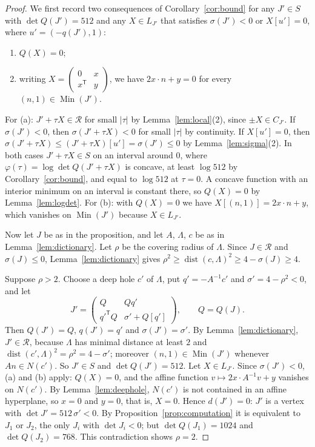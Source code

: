 \documentclass[11pt]{amsart}
\theoremstyle{definition}
\theoremstyle{remark}
\numberwithin{equation}{section}
\numberwithin{table}{section}
\numberwithin{figure}{section}
\newcommand{\Rk}{\mathcal{R}}
\newcommand{\Min}{\operatorname{Min}}
\newcommand{\dist}{\operatorname{dist}}
\newcommand{\T}{\mathsf{T}}
\begin{document}
\begin{proof}
We first record two consequences of Corollary~\ref{cor:bound} for any $J'\in S$ with $\det Q(J')=512$ and any $X\in L_{J'}$ that satisfies $\sigma(J')<0$ or $X[u']=0$, where $u'=(-q(J'),1)$:
\begin{enumerate}
\item[(a)] $Q(X)=0$;
\item[(b)] writing $X=\left(\begin{smallmatrix}0&x\\x^\T&y\end{smallmatrix}\right)$, we have $2x\cdot n+y=0$ for every $(n,1)\in\Min(J')$.
\end{enumerate}
For (a): $J'+\tau X\in\Rk$ for small $|\tau|$ by Lemma~\ref{lem:local}(2), since $\pm X\in C_{J'}$. If $\sigma(J')<0$, then $\sigma(J'+\tau X)<0$ for small $|\tau|$ by continuity. If $X[u']=0$, then $\sigma(J'+\tau X)\le(J'+\tau X)[u']=\sigma(J')\le0$ by Lemma~\ref{lem:sigma}(2). In both cases $J'+\tau X\in S$ on an interval around $0$, where $\varphi(\tau)=\log\det Q(J'+\tau X)$ is concave, at least $\log512$ by Corollary~\ref{cor:bound}, and equal to $\log512$ at $\tau=0$. A concave function with an interior minimum on an interval is constant there, so $Q(X)=0$ by Lemma~\ref{lem:logdet}. For (b): with $Q(X)=0$ we have $X[(n,1)]=2x\cdot n+y$, which vanishes on $\Min(J')$ because $X\in L_{J'}$.

Now let $J$ be as in the proposition, and let $A$, $\Lambda$, $c$ be as in Lemma~\ref{lem:dictionary}. Let $\rho$ be the covering radius of $\Lambda$. Since $J\in\Rk$ and $\sigma(J)\le0$, Lemma~\ref{lem:dictionary} gives $\rho^2\ge\dist(c,\Lambda)^2\ge4-\sigma(J)\ge4$.

Suppose $\rho>2$. Choose a deep hole $c'$ of $\Lambda$, put $q'=-A^{-1}c'$ and $\sigma'=4-\rho^2<0$, and let
\[
J'=\begin{pmatrix}Q&Qq'\\ q'^\T Q&\sigma'+Q[q']\end{pmatrix},\qquad Q=Q(J).
\]
Then $Q(J')=Q$, $q(J')=q'$ and $\sigma(J')=\sigma'$. By Lemma~\ref{lem:dictionary}, $J'\in\Rk$, because $\Lambda$ has minimal distance at least $2$ and $\dist(c',\Lambda)^2=\rho^2=4-\sigma'$; moreover $(n,1)\in\Min(J')$ whenever $An\in N(c')$. So $J'\in S$ and $\det Q(J')=512$. Let $X\in L_{J'}$. Since $\sigma(J')<0$, (a) and (b) apply: $Q(X)=0$, and the affine function $v\mapsto2x\cdot A^{-1}v+y$ vanishes on $N(c')$. By Lemma~\ref{lem:deephole}, $N(c')$ is not contained in an affine hyperplane, so $x=0$ and $y=0$, that is, $X=0$. Hence $d(J')=0$: $J'$ is a vertex with $\det J'=512\,\sigma'<0$. By Proposition~\ref{prop:computation} it is equivalent to $J_1$ or $J_2$, the only $J_i$ with $\det J_i<0$; but $\det Q(J_1)=1024$ and $\det Q(J_2)=768$. This contradiction shows $\rho=2$.


\end{proof}
\end{document}
